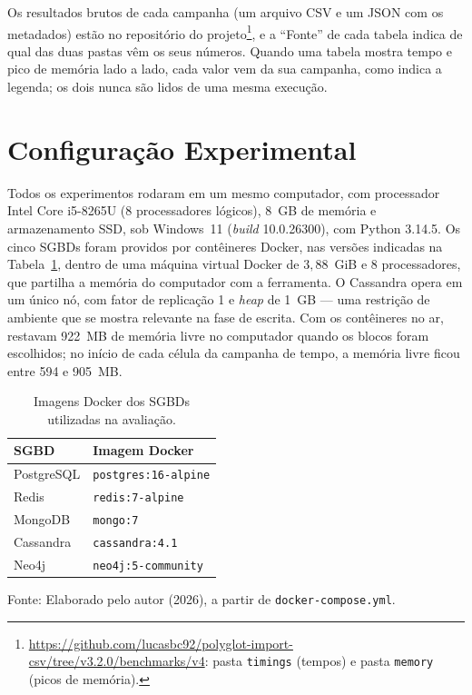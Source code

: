 Os resultados brutos de cada campanha (um arquivo CSV e um JSON com os metadados) estão no
repositório do projeto\footnote{\url{https://github.com/lucasbc92/polyglot-import-csv/tree/v3.2.0/benchmarks/v4}:
pasta \texttt{timings} (tempos) e pasta \texttt{memory} (picos de memória).}, e a ``Fonte'' de
cada tabela indica de qual das duas pastas vêm os seus números. Quando uma tabela mostra
tempo e pico de memória lado a lado, cada valor vem da sua campanha, como indica a legenda;
os dois nunca são lidos de uma mesma execução.

\section{Configuração Experimental}
\label{sec:config-experimental}

Todos os experimentos rodaram em um mesmo computador, com processador Intel Core i5-8265U
(8 processadores lógicos), 8~GB de memória e armazenamento SSD, sob Windows~11 (\textit{build}
10.0.26300), com Python 3.14.5. Os cinco SGBDs foram providos por contêineres Docker, nas
versões indicadas na Tabela~\ref{tab:ambiente-sgbds}, dentro de uma máquina virtual Docker de
$3{,}88$~GiB e 8 processadores, que partilha a memória do computador com a ferramenta. O
Cassandra opera em um único nó, com fator de replicação 1 e \textit{heap} de 1~GB --- uma
restrição de ambiente que se mostra relevante na fase de escrita. Com os contêineres no ar,
restavam 922~MB de memória livre no computador quando os blocos foram escolhidos; no início
de cada célula da campanha de tempo, a memória livre ficou entre 594 e 905~MB.

\begin{table}[H]
  \caption{Imagens Docker dos SGBDs utilizadas na avaliação.}
  \label{tab:ambiente-sgbds}
  \centering
  \begin{tabular}{l l}
    \toprule
    \textbf{SGBD} & \textbf{Imagem Docker} \\
    \midrule
    PostgreSQL & \texttt{postgres:16-alpine} \\
    Redis      & \texttt{redis:7-alpine} \\
    MongoDB    & \texttt{mongo:7} \\
    Cassandra  & \texttt{cassandra:4.1} \\
    Neo4j      & \texttt{neo4j:5-community} \\
    \bottomrule
  \end{tabular}
  \par\vspace{4pt}
  {\footnotesize Fonte: Elaborado pelo autor (2026), a partir de \texttt{docker-compose.yml}.}
\end{table}

